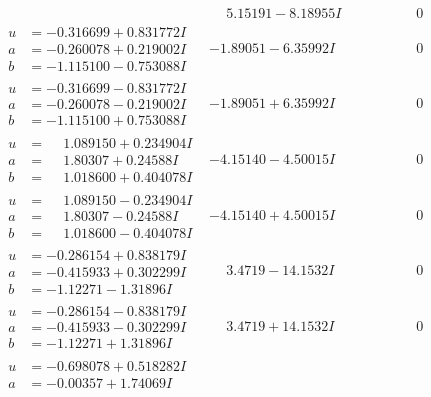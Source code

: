 \documentclass[1p]{elsarticle_modified}
\theoremstyle{definition}
\begin{document}
$$\begin{array}{c|c|c}
 & \phantom{-}5.15191 - 8.18955 I & \phantom{-0.000000 } 0 \\ \hline\begin{aligned}
u &= -0.316699 + 0.831772 I \\
a &= -0.260078 + 0.219002 I \\
b &= -1.115100 - 0.753088 I\end{aligned}
 & -1.89051 - 6.35992 I & \phantom{-0.000000 } 0 \\ \hline\begin{aligned}
u &= -0.316699 - 0.831772 I \\
a &= -0.260078 - 0.219002 I \\
b &= -1.115100 + 0.753088 I\end{aligned}
 & -1.89051 + 6.35992 I & \phantom{-0.000000 } 0 \\ \hline\begin{aligned}
u &= \phantom{-}1.089150 + 0.234904 I \\
a &= \phantom{-}1.80307 + 0.24588 I \\
b &= \phantom{-}1.018600 + 0.404078 I\end{aligned}
 & -4.15140 - 4.50015 I & \phantom{-0.000000 } 0 \\ \hline\begin{aligned}
u &= \phantom{-}1.089150 - 0.234904 I \\
a &= \phantom{-}1.80307 - 0.24588 I \\
b &= \phantom{-}1.018600 - 0.404078 I\end{aligned}
 & -4.15140 + 4.50015 I & \phantom{-0.000000 } 0 \\ \hline\begin{aligned}
u &= -0.286154 + 0.838179 I \\
a &= -0.415933 + 0.302299 I \\
b &= -1.12271 - 1.31896 I\end{aligned}
 & \phantom{-}3.4719 - 14.1532 I & \phantom{-0.000000 } 0 \\ \hline\begin{aligned}
u &= -0.286154 - 0.838179 I \\
a &= -0.415933 - 0.302299 I \\
b &= -1.12271 + 1.31896 I\end{aligned}
 & \phantom{-}3.4719 + 14.1532 I & \phantom{-0.000000 } 0 \\ \hline\begin{aligned}
u &= -0.698078 + 0.518282 I \\
a &= -0.00357 + 1.74069 I \\

\end{aligned}
\end{array}$$
\end{document}
